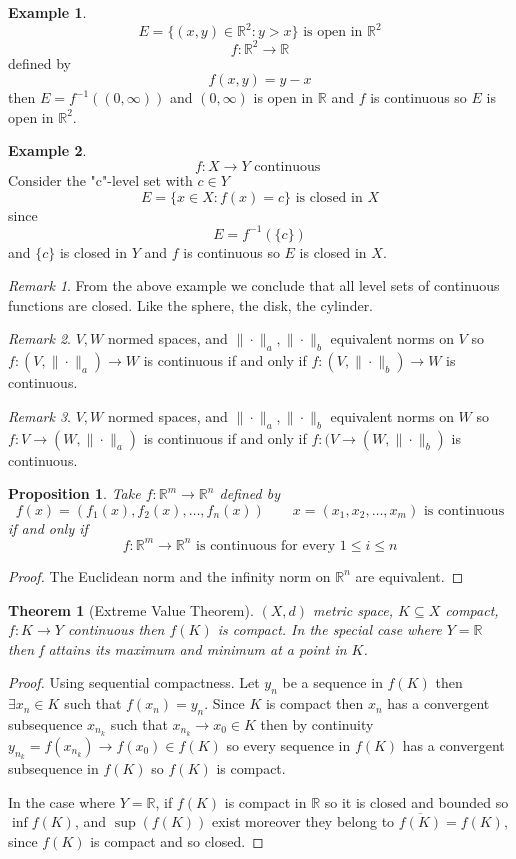 \documentclass[11pt,openany]{book}
\theoremstyle{plain}
\newtheorem{theorem}{Theorem}[chapter]
\newtheorem{proposition}{Proposition}[chapter]
\theoremstyle{definition}
\newtheorem{example}{Example}[chapter]
\theoremstyle{remark}
\newtheorem{remark}{Remark}[chapter]
\newcommand{\R}{\mathbb{R}}
\begin{document}
\begin{example}
    \[E = \{(x,y) \in \R^2: y >x\} \text{ is open in } \R^2\]\[f: \R^2 \to \R\] defined by \[f(x,y) = y - x\] then $E = f^{-1}((0,\infty))$ and $(0,\infty)$ is open in $\R$ and $f$ is continuous so $E$ is open in $\R^2$.
\end{example}
\begin{example}
    \[f: X \to Y \text{ continuous }\] Consider the "c"-level set with $c \in Y$ \[E = \{x \in X: f(x) = c\} \text{ is closed in } X\] since \[E = f^{-1}(\{c\})\] and $\{c\}$ is closed in $Y$ and $f$ is continuous so $E$ is closed in $X$.
\end{example}
\begin{remark}
    From the above example we conclude that all level sets of continuous functions are closed. Like the sphere, the disk, the cylinder.
\end{remark}
\begin{remark}
    $V,W$ normed spaces, and $\|\cdot\|_a,\|\cdot\|_b$ equivalent norms on $V$ so $f: (V,\|\cdot\|_a) \to W$ is continuous if and only if $f: (V,\|\cdot\|_b) \to W$ is continuous. 
\end{remark}
\begin{remark}
    $V,W$ normed spaces, and $\|\cdot\|_a,\|\cdot\|_b$ equivalent norms on $W$ so $f: V \to (W,\|\cdot\|_a)$ is continuous if and only if $f: (V \to (W,\|\cdot\|_b)$ is continuous. 
\end{remark}
\begin{proposition}
     Take $f: \R^m \to \R^n$ defined by \[f(x) = (f_1(x), f_2(x), \dots , f_n(x)) \qquad x= (x_1, x_2, \dots, x_m) \text{ is continuous}\] if and only if \[f:\R^m \to \R^n \text{ is continuous for every } 1 \le i \le n\]
\end{proposition}
    \begin{proof}
        The Euclidean norm and the infinity norm on $\R^n$ are equivalent.
    \end{proof}
\begin{theorem}[Extreme Value Theorem]
    $(X,d)$ metric space, $K \subseteq X$ compact, $f: K \to Y$ continuous then $f(K)$ is compact. In the special case where $Y = \R$ then f attains its maximum and minimum at a point in $K$.
\end{theorem}
\begin{proof}
    Using sequential compactness. Let $y_n$ be a sequence in $f(K)$ then $\exists x_n \in  K$ such that $f(x_n) = y_n$. Since $K$ is compact then $x_n$ has a convergent subsequence $x_{n_k}$ such that $x_{n_k} \to x_0 \in K$ then by continuity $y_{n_k} = f(x_{n_k}) \to f(x_0) \in f(K)$ so every sequence in $f(K)$ has a convergent subsequence in $f(K)$ so $f(K)$ is compact. 
    
    In the case where $Y = \R$, if $f(K)$ is compact in $\R$ so it is closed and bounded so  $\inf f(K)$, and $\sup(f(K))$ exist moreover they belong to $ \overline{f(K)} = f(K)$, since $f(K)$ is compact and so closed.
\end{proof}
\end{document}
